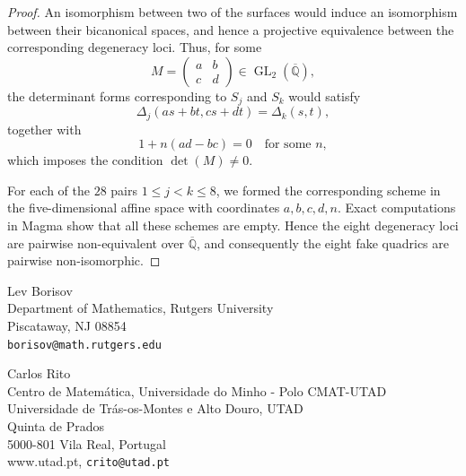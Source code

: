 \documentclass[11pt,a4paper]{article}
\begin{document}
\begin{proof}
An isomorphism between two of the surfaces would induce an isomorphism
between their bicanonical spaces, and hence a projective equivalence
between the corresponding degeneracy loci. Thus, for some
\[
        M=
        \begin{pmatrix}
        a&b\\ c&d
        \end{pmatrix}
        \in\operatorname{GL}_2(\overline{\mathbb Q}),
\]
the determinant forms corresponding to \(S_j\) and \(S_k\) would
satisfy
\[
        \Delta_j(as+bt,cs+dt)=\Delta_k(s,t),
\]
together with
\[
        1+n(ad-bc)=0
        \quad\text{for some }n,
\]
which imposes the condition \(\det(M)\neq0\).

For each of the \(28\) pairs \(1\leq j<k\leq8\), we formed the
corresponding scheme in the five-dimensional affine space with
coordinates \(a,b,c,d,n\). Exact computations in Magma show that all
these schemes are empty. Hence the eight degeneracy loci are pairwise
non-equivalent over \(\overline{\mathbb Q}\), and consequently the eight
fake quadrics are pairwise non-isomorphic.
\end{proof}







{\small


}


\vspace{1cm}

\noindent Lev Borisov \vspace{0.1cm} 
\\Department of Mathematics, Rutgers University
\\Piscataway, NJ 08854
\\ \verb|borisov@math.rutgers.edu| 

\vspace{1cm}

\noindent Carlos Rito
\vspace{0.1cm}
\\ Centro de Matem\'atica, Universidade do Minho - Polo CMAT-UTAD
\vspace{0.1cm}
\\ Universidade de Tr\'as-os-Montes e Alto Douro, UTAD
\\ Quinta de Prados
\\ 5000-801 Vila Real, Portugal
\vspace{0.1cm}
\\ www.utad.pt, {\tt crito@utad.pt}
\end{document}
